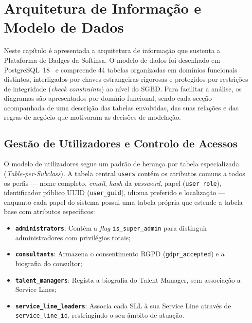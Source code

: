 \documentclass[12pt,a4paper]{report}
\begin{document}
\chapter{Arquitetura de Informação e Modelo de Dados}
\label{ch:arquitetura}

Neste capítulo é apresentada a arquitetura de informação que sustenta a Plataforma de Badges da Softinsa. O modelo de dados foi desenhado em PostgreSQL~18~\cite{postgresql} e compreende 44 tabelas organizadas em domínios funcionais distintos, interligados por chaves estrangeiras rigorosas e protegidos por restrições de integridade (\textit{check constraints}) ao nível do SGBD. Para facilitar a análise, os diagramas são apresentados por domínio funcional, sendo cada secção acompanhada de uma descrição das tabelas envolvidas, das suas relações e das regras de negócio que motivaram as decisões de modelação.

\section{Gestão de Utilizadores e Controlo de Acessos}
\label{sec:db-users}

O modelo de utilizadores segue um padrão de herança por tabela especializada (\textit{Table-per-Subclass}). A tabela central \texttt{users} contém os atributos comuns a todos os perfis --- nome completo, \textit{email}, \textit{hash} da \textit{password}, papel (\texttt{user\_role}), identificador público UUID (\texttt{user\_guid}), idioma preferido e localização --- enquanto cada papel do sistema possui uma tabela própria que estende a tabela base com atributos específicos:

\begin{itemize}
  \item \textbf{\texttt{administrators}}: Contém a \textit{flag} \texttt{is\_super\_admin} para distinguir administradores com privilégios totais;
  \item \textbf{\texttt{consultants}}: Armazena o consentimento RGPD (\texttt{gdpr\_accepted}) e a biografia do consultor;
  \item \textbf{\texttt{talent\_managers}}: Regista a biografia do Talent Manager, sem associação a Service Lines;
  \item \textbf{\texttt{service\_line\_leaders}}: Associa cada SLL à sua Service Line através de \texttt{service\_\allowbreak line\_id}, restringindo o seu âmbito de atuação.
\end{itemize}
\end{document}
